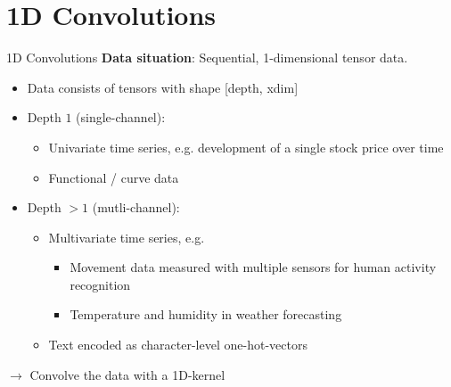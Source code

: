 \documentclass[11pt,compress,t,notes=noshow, xcolor=table]{beamer}
\begin{document}


\section{1D Convolutions}

\begin{vbframe}{1D Convolutions}
\textbf{Data situation}: Sequential, 1-dimensional tensor data. 

\begin{itemize}
\item Data consists of tensors with shape [depth, xdim]
\item Depth $1$ (single-channel):
    \begin{itemize}
        \item Univariate time series, e.g. development of a single stock price over time
        \item Functional / curve data
    \end{itemize}
\item Depth $> 1$ (mutli-channel):
    \begin{itemize}
        \item Multivariate time series, e.g.
        \begin{itemize}
            \item Movement data measured with multiple sensors for human activity recognition
            \item Temperature and humidity in weather forecasting
        \end{itemize}
        \item Text encoded as character-level one-hot-vectors 
    \end{itemize}
\end{itemize}

$\to$ Convolve the data with a 1D-kernel

\end{vbframe}
\end{document}
